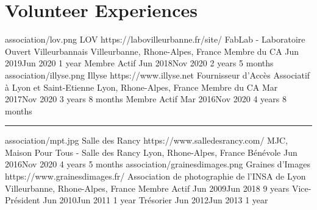 \documentclass[singlesided,
  paper=a4,
  fontsize=10pt
]{resume}
\begin{document}
{  \section[\fa{hands-helping}]{Volunteer Experiences}
    \volunteerorganization%
      {association/lov.png}%
      {LOV}%
      {https://labovilleurbanne.fr/site/}%
      {FabLab - Laboratoire Ouvert Villeurbannais}%
      {Villeurbanne, Rhone-Alpes, France}%
      {
        \volunteerposition%
          {Membre du CA}%
          {Jun 2019\textendash Jun 2020}%
          {1 year}%
          {}
        \volunteerposition%
          {Membre Actif}%
          {Jun 2018\textendash Nov 2020}%
          {2 years 5 months}%
          {}
      }
      \hspace{0.01\linewidth}{\color{midrules}\vline}\hfill
    \volunteerorganization%
      {association/illyse.png}%
      {Illyse}%
      {https://www.illyse.net}%
      {Fournisseur d'Accès Associatif à Lyon et Saint-Etienne}%
      {Lyon, Rhone-Alpes, France}%
      {
        \volunteerposition%
          {Membre du CA}%
          {Mar 2017\textendash Nov 2020}%
          {3 years 8 months}%
          {}
        \volunteerposition%
          {Membre Actif}%
          {Mar 2016\textendash Nov 2020}%
          {4 years 8 months}%
          {}
      }
      \textcolor{midrules}{\rule{\linewidth}{0.5pt}}%
      \vspace{-1em}
    \volunteerorganization%
      {association/mpt.jpg}%
      {Salle des Rancy}%
      {https://www.salledesrancy.com/}%
      {MJC, Maison Pour Tous - Salle des Rancy}%
      {Lyon, Rhone-Alpes, France}%
      {
        \volunteerposition%
          {Bénévole}%
          {Jun 2016\textendash Nov 2020}%
          {4 years 5 months}%
          {}
      }
      \hspace{0.01\linewidth}{\color{midrules}\vline}\hfill
    \volunteerorganization%
      {association/grainesdimages.png}%
      {Graines d'Images}%
      {https://www.grainesdimages.fr/}%
      {Association de photographie de l'INSA de Lyon}%
      {Villeurbanne, Rhone-Alpes, France}%
      {
        \volunteerposition%
          {Membre Actif}%
          {Jun 2009\textendash Jun 2018}%
          {9 years}%
          {}
        \volunteerposition%
          {Vice-Président}%
          {Jun 2010\textendash Jun 2011}%
          {1 year}%
          {}
        \volunteerposition%
          {Trésorier}%
          {Jun 2012\textendash Jun 2013}%
          {1 year}%
          {}
      }
  \vspace{-1.5em}
}
\end{document}
